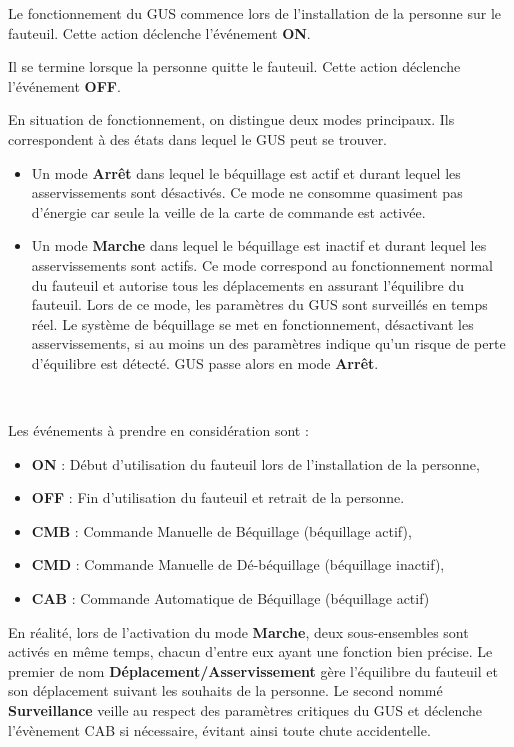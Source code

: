 Le fonctionnement du GUS commence lors de l'installation de la personne sur le fauteuil. Cette action déclenche l'événement \textbf{ON}.

Il se termine lorsque la personne quitte le fauteuil. Cette action déclenche l'événement \textbf{OFF}.

En situation de fonctionnement, on distingue deux modes principaux. Ils correspondent à des états dans lequel le GUS peut se trouver.
\begin{itemize}
 \item Un mode \textbf{Arrêt} dans lequel le béquillage est actif et durant lequel les asservissements sont désactivés. Ce mode ne consomme quasiment pas d'énergie car seule la veille de la carte de commande est activée.
 \item Un mode \textbf{Marche} dans lequel le béquillage est inactif et durant lequel les asservissements sont actifs. Ce mode correspond au fonctionnement normal du fauteuil et autorise tous les déplacements en assurant l'équilibre du fauteuil. Lors de ce mode, les paramètres du GUS
sont surveillés en temps réel. Le système de béquillage se met en fonctionnement, désactivant les asservissements, si au moins un des paramètres indique qu'un risque de perte d'équilibre est détecté. GUS passe alors en mode \textbf{Arrêt}.
\end{itemize}

~\

Les événements à prendre en considération sont :
\begin{itemize}
 \item \textbf{ON} : Début d'utilisation du fauteuil lors de l'installation de la personne,
 \item \textbf{OFF} : Fin d'utilisation du fauteuil et retrait de la personne.
\end{itemize}
\begin{itemize}
 \item \textbf{CMB} : Commande Manuelle de Béquillage (béquillage actif),
 \item \textbf{CMD} : Commande Manuelle de Dé-béquillage (béquillage inactif),
 \item \textbf{CAB} : Commande Automatique de Béquillage (béquillage actif)
\end{itemize}


En réalité, lors de l'activation du mode \textbf{Marche}, deux sous-ensembles sont activés en même temps, chacun d'entre eux ayant une fonction bien précise. Le premier de nom \textbf{Déplacement/Asservissement} gère l'équilibre du fauteuil et son déplacement suivant les souhaits de la personne. Le second nommé \textbf{Surveillance} veille au respect des paramètres critiques du GUS et déclenche l'évènement CAB si nécessaire, évitant ainsi toute chute accidentelle.


